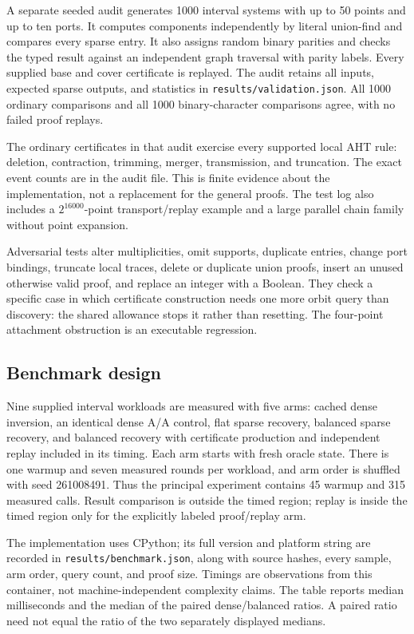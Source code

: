 \documentclass[11pt,letterpaper]{article}
\newcommand{\code}[1]{\nolinkurl{#1}}
\begin{document}
A separate seeded audit generates 1000 interval systems with up to 50 points
and up to ten ports. It computes components independently by literal union-find
and compares every sparse entry. It also assigns random binary parities and
checks the typed result against an independent graph traversal with parity
labels. Every supplied base and cover certificate is replayed. The audit retains
all inputs, expected sparse outputs, and statistics in
\code{results/validation.json}. All 1000 ordinary comparisons and all 1000
binary-character comparisons agree, with no failed proof replays.

The ordinary certificates in that audit exercise every supported local AHT
rule: deletion, contraction, trimming, merger, transmission, and truncation.
The exact event counts are in the audit file. This is finite evidence about
the implementation, not a replacement for the general proofs. The test log
also includes a $2^{16000}$-point transport/replay example and a large parallel
chain family without point expansion.

Adversarial tests alter multiplicities, omit supports, duplicate entries,
change port bindings, truncate local traces, delete or duplicate union proofs,
insert an unused otherwise valid proof, and replace an integer with a Boolean.
They check a specific case in which certificate construction needs one more
orbit query than discovery: the shared allowance stops it rather than
resetting. The four-point attachment obstruction is an executable regression.

\subsection{Benchmark design}
Nine supplied interval workloads are measured with five arms: cached dense
inversion, an identical dense A/A control, flat sparse recovery, balanced sparse
recovery, and balanced recovery with certificate production and independent
replay included in its timing. Each arm starts with fresh oracle state. There
is one warmup and seven measured rounds per workload, and arm order is shuffled
with seed 261008491. Thus the principal experiment contains 45 warmup and 315
measured calls. Result comparison is outside the timed region; replay is
inside the timed region only for the explicitly labeled proof/replay arm.

The implementation uses CPython; its full version and platform string are
recorded in \code{results/benchmark.json}, along with source hashes, every
sample, arm order, query count, and proof size. Timings are observations from
this container, not machine-independent complexity claims. The table reports
median milliseconds and the median of the paired dense/balanced ratios. A
paired ratio need not equal the ratio of the two separately displayed medians.
\end{document}
